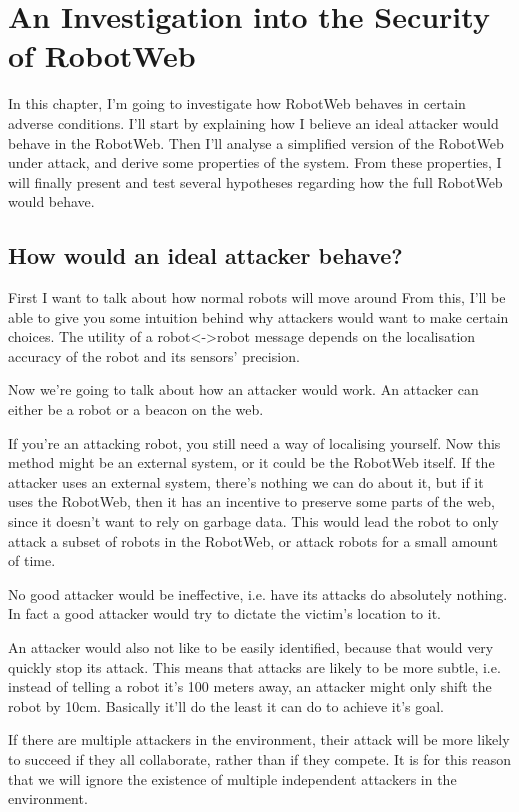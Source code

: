 \chapter{An Investigation into the Security of RobotWeb}

In this chapter, I'm going to investigate how RobotWeb behaves in certain adverse conditions.
I'll start by explaining how I believe an ideal attacker would behave in the RobotWeb.
Then I'll analyse a simplified version of the RobotWeb under attack, and derive some properties of the system.
From these properties, I will finally present and test several hypotheses regarding how the full RobotWeb would behave.

\section{How would an ideal attacker behave?}
First I want to talk about how normal robots will move around
From this, I'll be able to give you some intuition behind why attackers would want to make certain choices.
The utility of a robot<->robot message depends on the localisation accuracy of the robot and its sensors' precision.

Now we're going to talk about how an attacker would work.
An attacker can either be a robot or a beacon on the web.

If you're an attacking robot, you still need a way of localising yourself.
Now this method might be an external system, or it could be the RobotWeb itself.
If the attacker uses an external system, there's nothing we can do about it, but if it uses the RobotWeb,
then it has an incentive to preserve some parts of the web, since it doesn't want to rely on garbage data.
This would lead the robot to only attack a subset of robots in the RobotWeb, or attack robots for a small amount of time.

No good attacker would be ineffective, i.e. have its attacks do absolutely nothing.
In fact a good attacker would try to dictate the victim's location to it.

An attacker would also not like to be easily identified, because that would very quickly stop its attack.
This means that attacks are likely to be more subtle, i.e. instead of telling a robot it's 100 meters away, an attacker might only shift the robot by 10cm.
Basically it'll do the least it can do to achieve it's goal. 

If there are multiple attackers in the environment, their attack will be more likely to succeed if they all collaborate, rather than if they compete.
It is for this reason that we will ignore the existence of multiple independent attackers in the environment.

